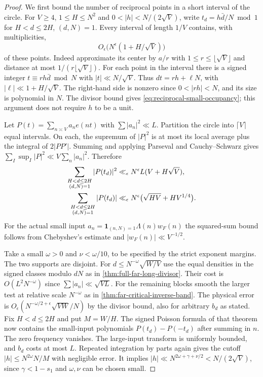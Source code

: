 \documentclass[11pt,a4paper]{article}
\numberwithin{equation}{section}
\begin{document}
\begin{proof}
We first bound the number of reciprocal points in a short
interval of the circle. For $V\ge4$, $1\le H\le N^2$ and
$0<|h|<N/(2\sqrt V)$, write
$t_d=h\bar d/N\bmod1$ for $H<d\le2H$, $(d,N)=1$.
Every interval of length $1/V$ contains, with multiplicities,
\begin{equation}
 O_\epsilon\big(N^\epsilon(1+H/\sqrt V)\big)
 \label{eq:reciprocal-small-occupancy}
\end{equation}
of these points. Indeed approximate its center by $a/r$ with
$1\le r\le\lfloor\sqrt V\rfloor$ and distance at most
$1/(r\lfloor\sqrt V\rfloor)$. For each point in the interval
there is a signed integer $t\equiv rh\bar d\bmod N$ with
$|t|\ll N/\sqrt V$. Thus $dt=rh+\ell N$, with
$|\ell|\ll1+H/\sqrt V$. The right-hand side is nonzero since
$0<|rh|<N$, and its size is polynomial in $N$. The divisor
bound gives \eqref{eq:reciprocal-small-occupancy}; this argument
does not require $h$ to be a unit.

Let $P(t)=\sum_{n\asymp V}a_ne(nt)$ with
$\sum|a_n|^2\ll L$. Partition the circle into $\lceil V\rceil$
equal intervals. On each, the supremum of $|P|^2$ is at most
its local average plus the integral of $2|P P'|$. Summing and
applying Parseval and Cauchy--Schwarz gives
$\sum_I\sup_I |P|^2\ll V\sum_n|a_n|^2$. Therefore
\begin{align}
 \sum_{\substack{H<d\le2H\\(d,N)=1}}|P(t_d)|^2
       &\ll_\epsilon N^\epsilon L(V+H\sqrt V),\notag\\
 \sum_{\substack{H<d\le2H\\(d,N)=1}}|P(t_d)|
       &\ll_\epsilon N^\epsilon\big(\sqrt{HV}+HV^{1/4}\big).
 \label{eq:reciprocal-small-first}
\end{align}
For the actual small input $a_n=\mathbf1_{(n,N)=1}
\Lambda(n)w_F(n)$ the squared-sum bound follows from
Chebyshev's estimate and $|w_F(n)|\ll V^{-1/2}$.

Take a small $\omega>0$ and $\nu<\omega/10$, to be specified
by the strict exponent margins. The two supports are disjoint.
For $d\le N^{-\omega}\sqrt{W/V}$ use the equal densities
in the signed classes modulo $dN$ as in
\cref{thm:full-far-long-divisor}. Their cost is
$O(L^2 N^{-\omega})$ since $\sum |a_n|\ll\sqrt{VL}$.
For the remaining blocks smooth the larger test at relative
scale $N^{-\omega}$ as in \cref{thm:far-critical-inverse-band}.
The physical error is $O_\epsilon(N^{-\omega/2+\epsilon}
\sqrt{VW}/N)$ by the divisor bound, also for arbitrary $b_d$
as stated. Fix $H<d\le2H$ and put $M=W/H$.
The signed Poisson formula of that theorem now contains the
small-input polynomials $P(t_d)-P(-t_d)$ after summing in $n$.
The zero frequency vanishes. The large-input transform is
uniformly bounded, and $b_d$ costs at most $L$. Repeated
integration by parts again gives the cutoff
$|h|\le N^{2\omega}N/M$ with negligible error. It implies
$|h|\ll N^{2\omega+\gamma+\nu/2}<N/(2\sqrt V)$, since
$\gamma<1-s_1$ and $\omega,\nu$ can be chosen small.


\end{proof}
\end{document}
